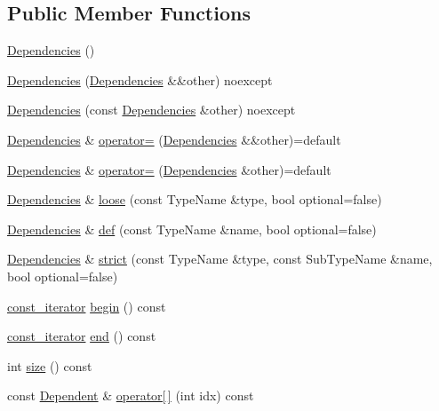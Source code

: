 \subsection*{Public Member Functions}
\begin{DoxyCompactItemize}
\item 
\hyperlink{classtheoria_1_1core_1_1Dependencies_ae3db86a4936549bceb0a358fa0b695e4}{Dependencies} ()
\item 
\hyperlink{classtheoria_1_1core_1_1Dependencies_a71b275a54e4261724540c60818d4ef85}{Dependencies} (\hyperlink{classtheoria_1_1core_1_1Dependencies}{Dependencies} \&\&other) noexcept
\item 
\hyperlink{classtheoria_1_1core_1_1Dependencies_ad3f8a71bd7ce6ff9e244d7072eb030e7}{Dependencies} (const \hyperlink{classtheoria_1_1core_1_1Dependencies}{Dependencies} \&other) noexcept
\item 
\hyperlink{classtheoria_1_1core_1_1Dependencies}{Dependencies} \& \hyperlink{classtheoria_1_1core_1_1Dependencies_ac1b06e338d69428c95de7851dfc43935}{operator=} (\hyperlink{classtheoria_1_1core_1_1Dependencies}{Dependencies} \&\&other)=default
\item 
\hyperlink{classtheoria_1_1core_1_1Dependencies}{Dependencies} \& \hyperlink{classtheoria_1_1core_1_1Dependencies_ac0c7b2c350c5e904732ed07b13852c21}{operator=} (\hyperlink{classtheoria_1_1core_1_1Dependencies}{Dependencies} \&other)=default
\item 
\hyperlink{classtheoria_1_1core_1_1Dependencies}{Dependencies} \& \hyperlink{classtheoria_1_1core_1_1Dependencies_afa22a8f9fc20d3ce417bac397ba22e7a}{loose} (const Type\+Name \&type, bool optional=false)
\item 
\hyperlink{classtheoria_1_1core_1_1Dependencies}{Dependencies} \& \hyperlink{classtheoria_1_1core_1_1Dependencies_ae3995847906cda98292e0a9215797d41}{def} (const Type\+Name \&name, bool optional=false)
\item 
\hyperlink{classtheoria_1_1core_1_1Dependencies}{Dependencies} \& \hyperlink{classtheoria_1_1core_1_1Dependencies_a7daeed943359e4290cbdcf6d0c3c57b5}{strict} (const Type\+Name \&type, const Sub\+Type\+Name \&name, bool optional=false)
\item 
\hyperlink{classtheoria_1_1core_1_1Dependencies_af58b879e807df8fb52b96c9ab1eb6073}{const\+\_\+iterator} \hyperlink{classtheoria_1_1core_1_1Dependencies_a830f5b83a926234ace464e441670974b}{begin} () const
\item 
\hyperlink{classtheoria_1_1core_1_1Dependencies_af58b879e807df8fb52b96c9ab1eb6073}{const\+\_\+iterator} \hyperlink{classtheoria_1_1core_1_1Dependencies_ae1acd1d0962abda73cb1a46447dd4a5e}{end} () const
\item 
int \hyperlink{classtheoria_1_1core_1_1Dependencies_a5d099bcbccf7ae14e5a373aa6be82288}{size} () const
\item 
const \hyperlink{structtheoria_1_1core_1_1Dependencies_1_1Dependent}{Dependent} \& \hyperlink{classtheoria_1_1core_1_1Dependencies_afba2a36945b9320b793ff8f3350ce468}{operator\mbox{[}$\,$\mbox{]}} (int idx) const
\end{DoxyCompactItemize}
